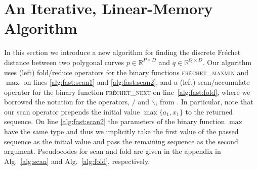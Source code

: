 \section{An Iterative, Linear-Memory Algorithm}
\label{sec:fast}
In this section we introduce a new algorithm for finding the discrete Fr\'echet distance between two polygonal curves $p \in \mathbb{R}^{P \times D}$ and $q \in \mathbb{R}^{Q \times D}$.
Our algorithm uses (left) fold/reduce operators for the binary functions \textsc{fr\'echet\_maxmin} and $\max$ on lines \ref{alg:fast:scan1} and \ref{alg:fast:scan2}, and a (left) scan/accumulate operator for the binary function \textsc{fr\'echet\_next} on line~\ref{alg:fast:fold}, where we borrowed the notation for the operators, $/$ and $\backslash$, from \citet{iverson62,iverson79}.
In particular, note that our scan operator prepends the initial value $\max\{ a_1, x_1 \}$ to the returned sequence.
On line \ref{alg:fast:scan2} the parameters of the binary function $\max$ have the same type and thus we implicitly take the first value of the passed sequence as the initial value and pass the remaining sequence as the second argument.
Pseudocodes for scan and fold are given in the appendix in Alg.~\ref{alg:scan} and Alg.~\ref{alg:fold}, respectively.

